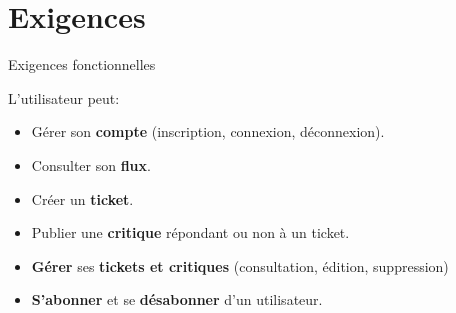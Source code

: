 \section{Exigences}

\begin{frame}{Exigences fonctionnelles}
  \begin{block}{L'utilisateur peut:}
    \begin{itemize}
    \item Gérer son \textbf{compte} {\tiny(inscription, connexion, déconnexion)}.
    \item Consulter son \textbf{flux}.
    \item Créer un \textbf{ticket}.
    \item Publier une \textbf{critique} répondant ou non à un ticket.
    \item \textbf{Gérer} ses \textbf{tickets et critiques} {\tiny (consultation, édition, suppression)}
    \item \textbf{S'abonner} et se \textbf{désabonner} d'un utilisateur.
    \end{itemize}    
  \end{block}
\end{frame}
